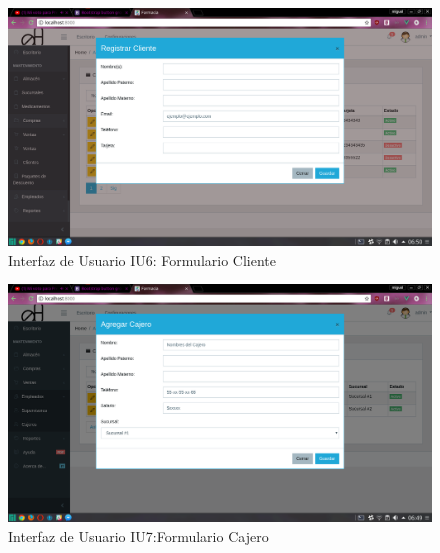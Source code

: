 \begin{figure}[htbp!]
	\begin{center}
\includegraphics[width=\textwidth]{Pantallas/FormularioClientes}
		\caption{Interfaz de Usuario IU6: Formulario Cliente}
	\end{center}
\end{figure}


\begin{figure}[htbp!]
	\begin{center}
\includegraphics[width=\textwidth]{Pantallas/FormulariCajero}
		\caption{Interfaz de Usuario IU7:Formulario Cajero}
	\end{center}
\end{figure}



